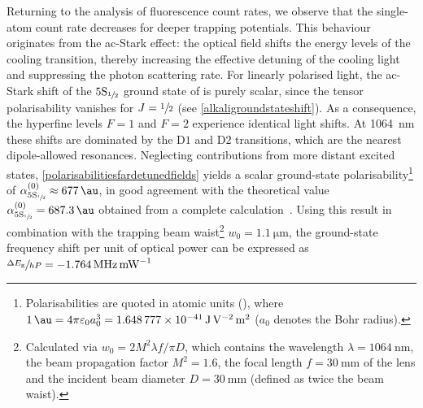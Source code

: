 \documentclass[../Thesis-IJspeert.tex]{subfiles}
\begin{document}
Returning to the analysis of fluorescence count rates, we observe that the single-atom count rate decreases for deeper trapping potentials. This behaviour originates from the ac-Stark effect: the optical field shifts the energy levels of the cooling transition, thereby increasing the effective detuning of the cooling light and suppressing the photon scattering rate. For linearly polarised light, the ac-Stark shift of the $5\mathrm{S}_{\sfrac{1}{2}}$ ground state of  is purely scalar, since the tensor polarisability vanishes for $J=\sfrac{1}{2}$ (see \autoref{alkaligroundstateshift}). As a consequence, the hyperfine levels $F=1$ and $F=2$ experience identical light shifts. At \SI{1064}{\nano\meter} these shifts are dominated by the $\mathrm{D}1$ and $\mathrm{D}2$ transitions, which are the nearest dipole-allowed resonances. Neglecting contributions from more distant excited states, \autoref{polarisabilitiesfardetunedfields} yields a scalar ground-state polarisability\footnote{Polarisabilities are quoted in atomic units (\si{\au}), where $\SI{1}{\au} = 4\pi\varepsilon_0 a_0^3 = \SI{1.648777e-41}{\joule\per\volt\squared\meter\squared}$ ($a_0$ denotes the Bohr radius).} of $\alpha^{(0)}_{{5\mathrm{S}_{\sfrac{1}{2}}}} \approx \SI{677}{\au}$, in good agreement with the theoretical value $\alpha^{(0)}_{{5\mathrm{S}_{\sfrac{1}{2}}}} = \SI{687.3}{\au}$ obtained from a complete calculation~\cite{Arora2012}. Using this result in combination with the trapping beam waist\footnote{Calculated via $w_0=2M^2 \lambda f/\pi D$, which contains the wavelength $\lambda=\SI{1064}{\nano\meter}$, the beam propagation factor $M^2=1.6$, the focal length $f=\SI{30}{\milli\meter}$ of the lens and the incident beam diameter $D=\SI{30}{\milli\meter}$ (defined as twice the beam waist).} $w_0 = \SI{1.1}{\micro\meter}$, the ground-state frequency shift per unit of optical power can be expressed as $\sfrac{\Delta E_\mathrm{g}}{hP}=\SI{-1.764}{\mega\hertz\per\milli\watt}$
\end{document}
